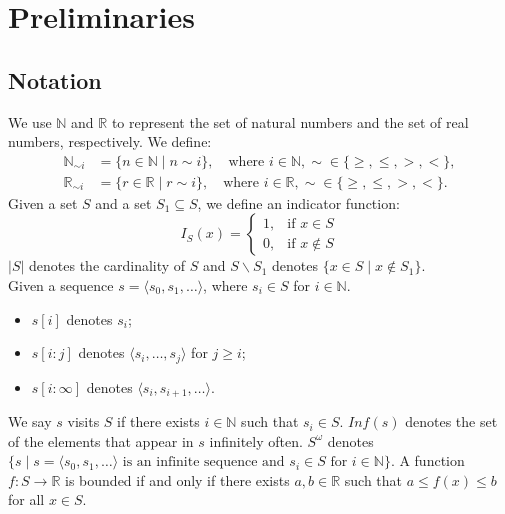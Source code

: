 \documentclass[acmlarge]{acmart}
\begin{document}


\section{Preliminaries}
\subsection{Notation}
\label{notation123}
We use \(\mathbb{N}\) and \(\mathbb{R}\) to represent the set of natural numbers and the set of real numbers, respectively. We define:
\begin{align*}
  \mathbb{N}_{\sim i} &= \{n \in \mathbb{N} \mid n \sim i\}, \quad \text{where } i \in \mathbb{N}, \sim \in \{\geq, \leq, >, <\}, \\
  \mathbb{R}_{\sim i} &= \{r \in \mathbb{R} \mid r \sim i\}, \quad \text{where } i \in \mathbb{R}, \sim \in \{\geq, \leq, >, <\}.
\end{align*}
Given a set \( S \) and a set $S_1 \subseteq S$, we define an indicator function:
$$I_S(x) = 
  \begin{cases} 
  1, & \text{if } x \in S \\
  0, & \text{if } x \not\in S 
  \end{cases}$$ 
$|S|$ denotes the cardinality of $S$ and $S\backslash S_1$ denotes $\{x \in S \mid x \not\in S_1\}$.\\
Given a sequence \( s = \langle s_0, s_1, \dots \rangle \), where $s_i \in S$ for $i \in \mathbb{N}$.
\begin{itemize}
  \item \( s[i] \) denotes \( s_i \);
  \item \( s[i:j] \) denotes \( \langle s_i, \dots, s_j \rangle \) for \( j \geq i \);
  \item \( s[i:\infty] \) denotes \( \langle s_i, s_{i+1}, \dots \rangle \).
\end{itemize}
We say $s$ visits $S$ if there exists $i \in \mathbb{N}$ such that $s_i \in S$. $Inf(s)$ denotes the set of the elements that appear in $s$ infinitely often. $S^{\omega}$ denotes $\{s \mid s=\langle s_0, s_1, \dots \rangle\text{ is an infinite sequence and }s_i \in S\text{ for }i \in \mathbb{N}\}$. A function $f: S \rightarrow \mathbb{R}$ is bounded if and only if there exists $a, b \in \mathbb{R}$ such that $a \leq f(x) \leq b$ for all $x \in S$.
\end{document}
